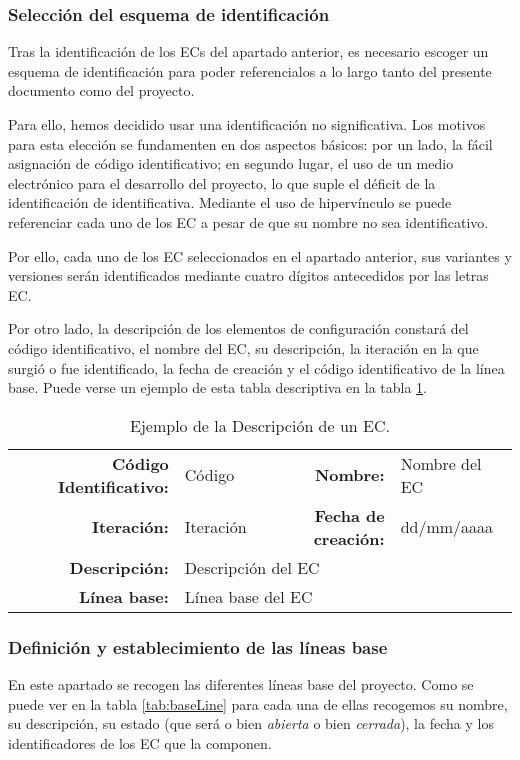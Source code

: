 \subsubsection{Selección del esquema de identificación}
\par Tras la identificación de los ECs del apartado anterior, es necesario escoger un esquema de identificación para poder referencialos a lo largo tanto del presente documento como del proyecto.
\par Para ello, hemos decidido usar una identificación no significativa. Los motivos para esta elección se fundamenten en dos aspectos básicos: por un lado, la fácil asignación de código identificativo; en segundo lugar, el uso de un medio electrónico para el desarrollo del proyecto, lo que suple el déficit de la identificación de identificativa. Mediante el uso de hipervínculo se puede referenciar cada uno de los EC a pesar de que su nombre no sea identificativo.
\par Por ello, cada uno de los EC seleccionados en el apartado anterior, sus variantes y versiones serán identificados mediante cuatro dígitos antecedidos por las letras EC.

\par Por otro lado, la descripción de los elementos de configuración constará del código identificativo, el nombre del EC, su descripción, la iteración en la que surgió o fue identificado, la fecha de creación y el código identificativo de la línea base. Puede verse un ejemplo de esta tabla descriptiva en la tabla \ref{tab:ECdescription}.

\begin{table}[h]
\begin{center}
\begin{tabular}{ r l | r l }
  \hline
\textbf{Código Identificativo:} & Código & \textbf{Nombre:} & Nombre del EC \\
\textbf{Iteración:} & Iteración & \textbf{Fecha de creación:} & dd/mm/aaaa \\ \hline \hline
\textbf{Descripción:} & \multicolumn{3}{l}{Descripción del EC} \\
\textbf{Línea base:} & \multicolumn{3}{l}{Línea base del EC} \\
\hline
\end{tabular}
\caption{Ejemplo de la Descripción de un EC.}
\label{tab:ECdescription}
\end{center}
\end{table}

\subsubsection{Definición y establecimiento de las líneas base}
\par En este apartado se recogen las diferentes líneas base del proyecto. Como se puede ver en la tabla \ref{tab:baseLine} para cada una de ellas recogemos su nombre, su descripción, su estado (que será o bien \textit{abierta} o bien \textit{cerrada}), la fecha y los identificadores de los EC que la componen.

